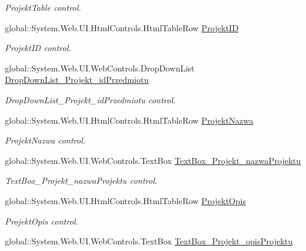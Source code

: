 \begin{DoxyCompactItemize}
\begin{DoxyCompactList}\small\item\em Projekt\+Table control. \end{DoxyCompactList}\item 
global\+::\+System.\+Web.\+U\+I.\+Html\+Controls.\+Html\+Table\+Row \hyperlink{class_dziennik_ocen_web2_1_1_web_form1_a9f87493b2d238e2f692040b0a55a87cc}{Projekt\+ID}
\begin{DoxyCompactList}\small\item\em Projekt\+ID control. \end{DoxyCompactList}\item 
global\+::\+System.\+Web.\+U\+I.\+Web\+Controls.\+Drop\+Down\+List \hyperlink{class_dziennik_ocen_web2_1_1_web_form1_aa1dcca0113aa3e8d239ef6fe3c91dadd}{Drop\+Down\+List\+\_\+\+Projekt\+\_\+id\+Przedmiotu}
\begin{DoxyCompactList}\small\item\em Drop\+Down\+List\+\_\+\+Projekt\+\_\+id\+Przedmiotu control. \end{DoxyCompactList}\item 
global\+::\+System.\+Web.\+U\+I.\+Html\+Controls.\+Html\+Table\+Row \hyperlink{class_dziennik_ocen_web2_1_1_web_form1_ad9257899086740c1e15537b8771eb526}{Projekt\+Nazwa}
\begin{DoxyCompactList}\small\item\em Projekt\+Nazwa control. \end{DoxyCompactList}\item 
global\+::\+System.\+Web.\+U\+I.\+Web\+Controls.\+Text\+Box \hyperlink{class_dziennik_ocen_web2_1_1_web_form1_a9ffad4170ae3c4a41c89ea8ff21f5c79}{Text\+Box\+\_\+\+Projekt\+\_\+nazwa\+Projektu}
\begin{DoxyCompactList}\small\item\em Text\+Box\+\_\+\+Projekt\+\_\+nazwa\+Projektu control. \end{DoxyCompactList}\item 
global\+::\+System.\+Web.\+U\+I.\+Html\+Controls.\+Html\+Table\+Row \hyperlink{class_dziennik_ocen_web2_1_1_web_form1_a3e54e8806cd16e24a83f6116805b5db1}{Projekt\+Opis}
\begin{DoxyCompactList}\small\item\em Projekt\+Opis control. \end{DoxyCompactList}\item 
global\+::\+System.\+Web.\+U\+I.\+Web\+Controls.\+Text\+Box \hyperlink{class_dziennik_ocen_web2_1_1_web_form1_a6ea6a10c6b9029ab3963c4032019257f}{Text\+Box\+\_\+\+Projekt\+\_\+opis\+Projektu}

\end{DoxyCompactItemize}
